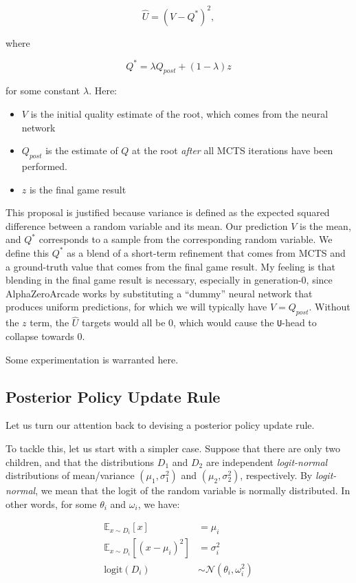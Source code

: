 \documentclass[tikz]{article}
\newcommand{\logit}{\mathrm{logit}}
\begin{document}
$$\hat{U} = (V - Q^*)^2,$$

where

$$Q^* = \lambda Q_{post} + (1-\lambda)z$$

for some constant $\lambda$. Here:

\begin{itemize}
    \item $V$ is the initial quality estimate of the root, which comes from the neural network
    \item $Q_{post}$ is the estimate of $Q$ at the root \emph{after} all MCTS iterations have been performed.
    \item $z$ is the final game result
\end{itemize}
This proposal is justified because variance is defined as the expected squared difference between a random variable and its mean.
Our prediction $V$ is the mean, and $Q^*$ corresponds to a sample from the corresponding random variable. We define this $Q^*$
as a blend of a short-term refinement that comes from MCTS and a ground-truth value that comes from the final game result.
My feeling is that blending in the final game result is necessary, especially in generation-0, since AlphaZeroArcade works by
substituting a ``dummy'' neural network that produces uniform predictions, for which we will typically have $V = Q_{post}$.
Without the $z$ term, the $\hat{U}$ targets would all be 0, which would cause the \texttt{U}-head to collapse towards 0. \newline

Some experimentation is warranted here. 

\subsection{Posterior Policy Update Rule}

Let us turn our attention back to devising a posterior policy update rule. \newline

To tackle this, let us start with a simpler case. Suppose that there are only two children, and that the
distributions $D_1$ and $D_2$ are independent \textit{logit-normal} distributions of mean/variance $(\mu_1, \sigma_1^2)$ and $(\mu_2, \sigma_2^2)$, respectively.
By \textit{logit-normal}, we mean that the logit of the random variable is normally distributed. In other words, for some $\theta_i$ and $\omega_i$, we have:

\begin{align*}
\mathbb{E}_{x \sim D_i}[x] &= \mu_i \\
\mathbb{E}_{x \sim D_i}[(x - \mu_i)^2] &= \sigma_i^2 \\
\logit(D_i) &\sim \mathcal{N}(\theta_i, \omega_i^2)
\end{align*}
\end{document}

